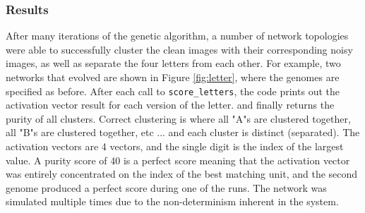 \documentclass[12pt,a4paper]{article}
\begin{document}
\subsubsection{Results}
After many iterations of the genetic algorithm, a number of network topologies were able to successfully cluster the clean images with their corresponding noisy images, as well as separate the four letters from each other.  For example, two networks that evolved are shown in Figure \ref{fig:letter}, where the genomes are specified as before.  After each call to \texttt{score\_letters}, the code prints out the activation vector result for each version of the letter. and finally returns the purity of all clusters.  Correct clustering is where all "A"s are clustered together, all "B"s are clustered together, etc ... and each cluster is distinct (separated).  The activation vectors are 4 vectors, and the single digit is the index of the largest value.  A purity score of 40 is a perfect score meaning that the activation vector was entirely concentrated on the index of the best matching unit, and the second genome produced a perfect score during one of the runs.  The network was simulated multiple times due to the non-determinism inherent in the system.
\end{document}
